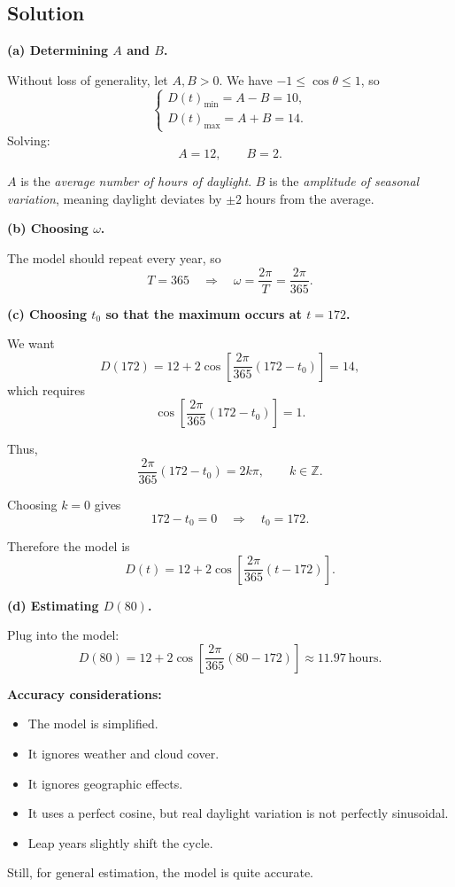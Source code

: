 \subsection*{Solution}


\textbf{(a) Determining $A$ and $B$.}

Without loss of generality, let $A,B>0$.  
We have $-1 \le \cos\theta \le 1$, so
\[
\begin{cases}
D(t)_{\min} = A - B = 10,\\[4pt]
D(t)_{\max} = A + B = 14.
\end{cases}
\]
Solving:
\[
A = 12, \qquad B = 2.
\]

$A$ is the \emph{average number of hours of daylight}.  
$B$ is the \emph{amplitude of seasonal variation}, meaning daylight deviates by $\pm 2$ hours from the average.

\textbf{(b) Choosing $\omega$.}

The model should repeat every year, so  
\[
T = 365 \quad \Rightarrow \quad \omega = \frac{2\pi}{T} = \frac{2\pi}{365}.
\]

\textbf{(c) Choosing $t_0$ so that the maximum occurs at $t=172$.}

We want
\[
D(172) = 12 + 2\cos\!\left[\frac{2\pi}{365}(172 - t_0)\right] = 14,
\]
which requires
\[
\cos\!\left[\frac{2\pi}{365}(172 - t_0)\right] = 1.
\]

Thus,
\[
\frac{2\pi}{365}(172 - t_0) = 2k\pi, \qquad k\in\mathbb{Z}.
\]

Choosing $k=0$ gives
\[
172 - t_0 = 0 \quad\Rightarrow\quad t_0 = 172.
\]

Therefore the model is
\[
D(t) = 12 + 2\cos\!\left[\frac{2\pi}{365}(t - 172)\right].
\]

\textbf{(d) Estimating $D(80)$.}

Plug into the model:
\[
D(80) = 12 + 2\cos\!\left[\frac{2\pi}{365}(80 - 172)\right]
       \approx 11.97\ \text{hours}.
\]

\textbf{Accuracy considerations:}
\begin{itemize}
    \item The model is simplified.  
    \item It ignores weather and cloud cover.  
    \item It ignores geographic effects.  
    \item It uses a perfect cosine, but real daylight variation is not perfectly sinusoidal.  
    \item Leap years slightly shift the cycle.  
\end{itemize}

Still, for general estimation, the model is quite accurate.



\pagebreak